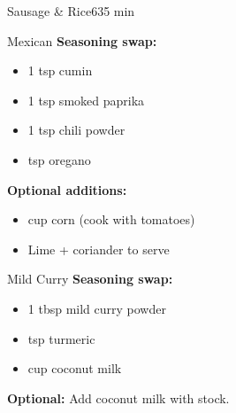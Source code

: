 \begin{recipebox}{Sausage \& Rice}{6}{35 min}
\begin{variationbox}{Mexican}
  \textbf{Seasoning swap:}
  \begin{itemize}
    \item 1 tsp cumin
    \item 1 tsp smoked paprika
    \item 1 tsp chili powder
    \item {} tsp oregano
  \end{itemize}
  \textbf{Optional additions:}
  \begin{itemize}
    \item {} cup corn (cook with tomatoes)
    \item Lime + coriander to serve
  \end{itemize}
\end{variationbox}

\begin{variationbox}{Mild Curry}
  \textbf{Seasoning swap:}
  \begin{itemize}
    \item 1 tbsp mild curry powder
    \item {} tsp turmeric
    \item {} cup coconut milk
  \end{itemize}
  \textbf{Optional:} Add coconut milk with stock.
\end{variationbox}

\end{recipebox}

